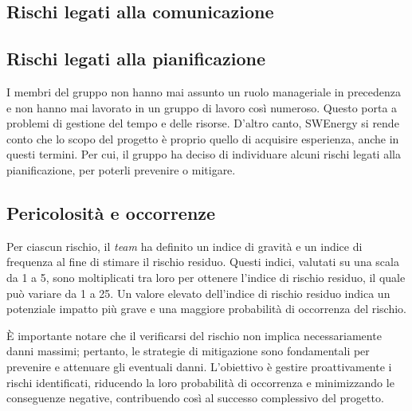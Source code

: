 \subsection{Rischi legati alla comunicazione}






\subsection{Rischi legati alla pianificazione}
I membri del gruppo non hanno mai assunto un ruolo manageriale in
precedenza e non hanno mai lavorato in un gruppo di lavoro così
numeroso. Questo porta a problemi di gestione del tempo e delle
risorse. D'altro canto, SWEnergy si rende conto che lo scopo del
progetto è proprio quello di acquisire esperienza, anche in questi
termini. Per cui, il gruppo ha deciso di individuare alcuni
rischi legati alla pianificazione, per poterli prevenire o mitigare.







\subsection{Pericolosità e occorrenze}
Per ciascun rischio, il \textit{team} ha definito un indice di gravità e 
un indice di frequenza al fine di stimare il rischio residuo. 
Questi indici, valutati su una scala da 1 a 5, sono moltiplicati tra loro 
per ottenere l'indice di rischio residuo, il quale può variare da 1 a 25. 
Un valore elevato dell'indice di rischio residuo indica un potenziale impatto 
più grave e una maggiore probabilità di occorrenza del rischio.

È importante notare che il verificarsi del rischio non implica necessariamente
 danni massimi; pertanto, le strategie di mitigazione sono fondamentali per 
 prevenire e attenuare gli eventuali danni. 
 L'obiettivo è gestire proattivamente i rischi identificati, riducendo la loro 
 probabilità di occorrenza e minimizzando le conseguenze negative, contribuendo 
 così al successo complessivo del progetto.



